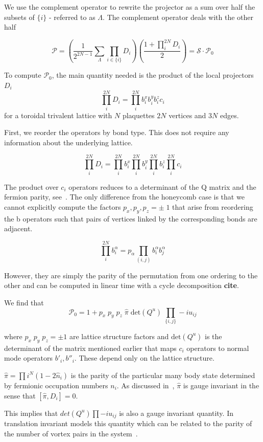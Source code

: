 We use the complement operator to rewrite the projector as a sum over half the subsets of \(\{i\}\) - referred to as \(\Lambda\). The complement operator deals with the other half

\[ \mathcal{P} =  \left( \frac{1}{2^{2N-1}} \sum_{\Lambda} \prod_{i\in\{i\}} D_i\right) \left(\frac{1 + \prod_i^{2N} D_i}{2}\right) = \mathcal{S} \cdot \mathcal{P}_0\]

To compute \(\mathcal{P}_0\), the main quantity needed is the product of the local projectors \(D_i\) \[\prod_i^{2N} D_i = \prod_i^{2N} b^x_i b^y_i b^z_i c_i \] for a toroidal trivalent lattice with \(N\) plaquettes \(2N\) vertices and \(3N\) edges.

First, we reorder the operators by bond type. This does not require any information about the underlying lattice.

\[\prod_i^{2N} D_i = \prod_i^{2N} b^x_i \prod_i^{2N} b^y_i \prod_i^{2N} b^z_i \prod_i^{2N} c_i\]

The product over \(c_i\) operators reduces to a determinant of the Q matrix and the fermion parity, see~\autocite{pedrocchiPhysicalSolutionsKitaev2011}. The only difference from the honeycomb case is that we cannot explicitly compute the factors \(p_x,p_y,p_z = \pm\;1\) that arise from reordering the b operators such that pairs of vertices linked by the corresponding bonds are adjacent.

\[\prod_i^{2N} b^\alpha_i = p_\alpha \prod_{(i,j)}b^\alpha_i b^\alpha_j\]

However, they are simply the parity of the permutation from one ordering to the other and can be computed in linear time with a cycle decomposition \textbf{cite}.

We find that \[\mathcal{P}_0 = 1 + p_x\;p_y\;p_z\; \hat{\pi} \; \mathrm{det}(Q^u) \; \prod_{\{i,j\}} -iu_{ij}\]

where \(p_x\;p_y\;p_z = \pm 1\) are lattice structure factors and \(\mathrm{det}(Q^u)\) is the determinant of the matrix mentioned earlier that maps \(c_i\) operators to normal mode operators \(b'_i, b''_i\). These depend only on the lattice structure.

\(\hat{\pi} = \prod{i}^{N} (1 - 2\hat{n}_i)\) is the parity of the particular many body state determined by fermionic occupation numbers \(n_i\). As discussed in~\autocite{pedrocchiPhysicalSolutionsKitaev2011}, \(\hat{\pi}\) is gauge invariant in the sense that \([\hat{\pi}, D_i] = 0\).

This implies that \(det(Q^u) \prod -i u_{ij}\) is also a gauge invariant quantity. In translation invariant models this quantity which can be related to the parity of the number of vortex pairs in the system~\autocite{yaoAlgebraicSpinLiquid2009}.

